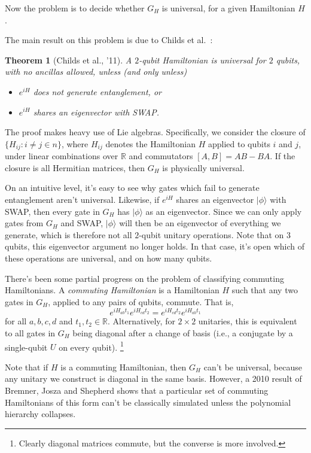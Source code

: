 \documentclass[12pt]{report}
\theoremstyle{plain}
\newtheorem{theorem}{Theorem}[section]
\theoremstyle{definition}
\newcommand{\R}{{\mathbb R}}
\renewcommand{\ket}[1]{|#1\rangle}
\begin{document}
Now the problem is to decide whether $G_H$ is universal, for a given Hamiltonian $H$.

The main result on this problem is due to Childs et al.\ \cite{childs}:

\begin{theorem}[Childs et al., '11]
A $2$-qubit Hamiltonian is universal for $2$ qubits, with no ancillas allowed, unless (and only unless)
\begin{itemize}
\item $e^{iH}$ does not generate entanglement, or
\item $e^{iH}$ shares an eigenvector with SWAP.
\end{itemize}
\end{theorem}

The proof makes heavy use of Lie algebras. Specifically, we consider the closure of $\{ H_{ij} : i \neq j \in n \}$, where $H_{ij}$ denotes the Hamiltonian $H$ applied to qubits $i$ and $j$, under linear combinations over $\R$ and commutators $[A,B] = AB - BA$. If the closure is all Hermitian matrices, then $G_H$ is physically universal.

On an intuitive level, it's easy to see why gates which fail to generate entanglement aren't universal. Likewise, if $e^{iH}$ shares an eigenvector $\ket{\phi}$ with SWAP, then every gate in $G_H$ has $\ket{\phi}$ as an eigenvector. Since we can only apply gates from $G_H$ and SWAP, $\ket{\phi}$ will then be an eigenvector of everything we generate, which is therefore not all $2$-qubit unitary operations. Note that on $3$ qubits, this eigenvector argument no longer holds. In that case, it's open which of these operations are universal, and on how many qubits.

There's been some partial progress on the problem of classifying commuting Hamiltonians. A \emph{commuting Hamiltonian} is a Hamiltonian $H$ such that any two gates in $G_H$, applied to any pairs of qubits, commute. That is,
$$
e^{i H_{ab} t_1} e^{i H_{cd} t_2} = e^{i H_{cd} t_2} e^{i H_{ab} t_1}
$$
for all $a,b,c,d$ and $t_1, t_2 \in \R$. Alternatively, for $2 \times 2$ unitaries, this is equivalent to all gates in $G_H$ being diagonal after a change of basis (i.e., a conjugate by a single-qubit $U$ on every qubit). \footnote{Clearly diagonal matrices commute, but the converse is more involved.}

Note that if $H$ is a commuting Hamiltonian, then $G_H$ can't be universal, because any unitary we construct is diagonal in the same basis. However, a 2010 result of Bremner, Josza and Shepherd \cite{bremner} shows that a particular set of commuting Hamiltonians of this form can't be classically simulated unless the polynomial hierarchy collapses.
\end{document}
